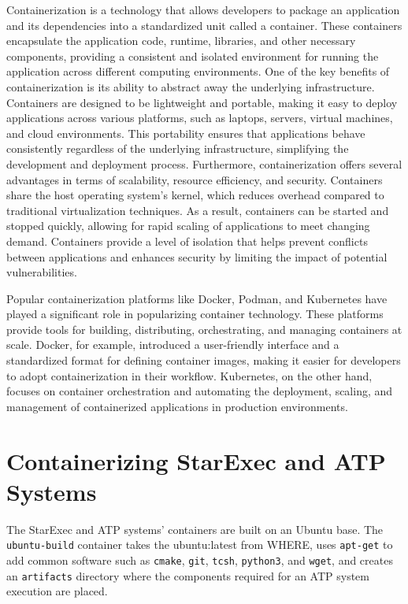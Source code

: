 \documentclass{easychair}
\begin{document}
Containerization is a technology that allows developers to package an application and its 
dependencies into a standardized unit called a container. 
These containers encapsulate the application code, runtime, libraries, and other necessary 
components, providing a consistent and isolated environment for running the application 
across different computing environments.
One of the key benefits of containerization is its ability to abstract away the underlying 
infrastructure. 
Containers are designed to be lightweight and portable, making it easy to deploy applications 
across various platforms, such as laptops, servers, virtual machines, and cloud environments. 
This portability ensures that applications behave consistently regardless of the underlying 
infrastructure, simplifying the development and deployment process.
Furthermore, containerization offers several advantages in terms of scalability, resource 
efficiency, and security. 
Containers share the host operating system's kernel, which reduces overhead compared to 
traditional virtualization techniques. 
As a result, containers can be started and stopped quickly, allowing for rapid scaling of 
applications to meet changing demand. 
Containers provide a level of isolation that helps prevent conflicts between applications and 
enhances security by limiting the impact of potential vulnerabilities.

Popular containerization platforms like Docker, Podman, and Kubernetes have played a significant 
role in popularizing container technology. 
These platforms provide tools for building, distributing, orchestrating, and managing containers 
at scale. 
Docker, for example, introduced a user-friendly interface and a standardized format for defining 
container images, making it easier for developers to adopt containerization in their workflow. 
Kubernetes, on the other hand, focuses on container orchestration and automating the deployment, 
scaling, and management of containerized applications in production environments.

\section{Containerizing StarExec and ATP Systems}
\label{Containerizing}

The StarExec and ATP systems' containers are built on an Ubuntu base.
The {\tt ubuntu-build} container takes the {\TT ubuntu:latest} from WHERE, uses {\tt apt-get}
to add common software such as {\tt cmake}, {\tt git}, {\tt tcsh}, {\tt python3}, and {\tt wget},
and creates an {\tt artifacts} directory where the components required for an ATP system
execution are placed.
\end{document}
